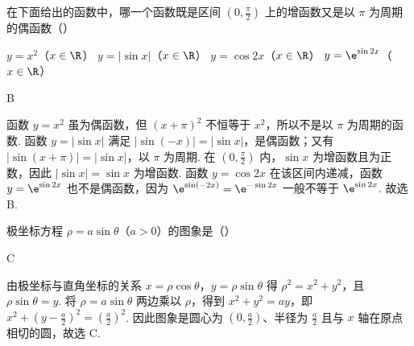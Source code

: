 \documentclass[UTF8,a4paper,oneside,11pt]{ctexbook}
\begin{document}
\begin{problem}

在下面给出的函数中，哪一个函数既是区间 \(\left(0, \frac{\pi}{2}\right)\) 上的增函数又是以 \(\pi\) 为周期的偶函数（\quad）

\choices
    {\(y = x^{2}\)（\(x\in \R\)）}
    {\(y = |\sin x|\)（\(x\in \R\)）}
    {\(y = \cos 2x\)（\(x\in \R\)）}
    {\(y = \e^{\sin 2x}\)（\(x \in \R\)）}

\begin{answer}
B
\end{answer}

\begin{solution}
函数 \(y=x^2\) 虽为偶函数，但 \((x+\pi)^2\) 不恒等于 \(x^2\)，所以不是以 \(\pi\) 为周期的函数. 函数 \(y=|\sin x|\) 满足 \(|\sin(-x)|=|\sin x|\)，是偶函数；又有 \(|\sin(x+\pi)|=|\sin x|\)，以 \(\pi\) 为周期. 在 \(\left(0,\frac{\pi}{2}\right)\) 内，\(\sin x\) 为增函数且为正数，因此 \(|\sin x|=\sin x\) 为增函数. 函数 \(y=\cos 2x\) 在该区间内递减，函数 \(y=\e^{\sin 2x}\) 也不是偶函数，因为 \(\e^{\sin(-2x)}=\e^{-\sin 2x}\) 一般不等于 \(\e^{\sin 2x}\). 故选 B.
\end{solution}
\end{problem}

\begin{problem}

极坐标方程 \(\rho = a\sin \theta\)（\(a > 0\)）的图象是（\quad）

\choices
    {}
    {}
    {}
    {}

\begin{answer}
C
\end{answer}

\begin{solution}
由极坐标与直角坐标的关系 \(x=\rho\cos\theta\)，\(y=\rho\sin\theta\) 得 \(\rho^2=x^2+y^2\)，且 \(\rho\sin\theta=y\). 将 \(\rho=a\sin\theta\) 两边乘以 \(\rho\)，得到 \(x^2+y^2=ay\)，即 \(x^2+\left(y-\frac{a}{2}\right)^2=\left(\frac{a}{2}\right)^2\). 因此图象是圆心为 \(\left(0,\frac{a}{2}\right)\)、半径为 \(\frac{a}{2}\) 且与 \(x\) 轴在原点相切的圆，故选 C.
\end{solution}
\end{problem}
\end{document}
